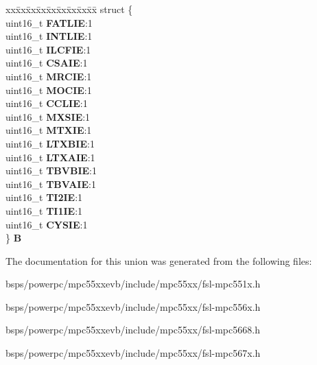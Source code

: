 \begin{DoxyCompactItemize}
\begin{tabbing}
\end{tabbing}\item 
\mbox{\label{unionuPIER0_aa1c26bbf66ee9ffb0bde25cbbf046ac5}} 
\begin{tabbing}
xx\=xx\=xx\=xx\=xx\=xx\=xx\=xx\=xx\=\kill
struct \{\\
\>uint16\_t {\bfseries FATLIE}:1\\
\>uint16\_t {\bfseries INTLIE}:1\\
\>uint16\_t {\bfseries ILCFIE}:1\\
\>uint16\_t {\bfseries CSAIE}:1\\
\>uint16\_t {\bfseries MRCIE}:1\\
\>uint16\_t {\bfseries MOCIE}:1\\
\>uint16\_t {\bfseries CCLIE}:1\\
\>uint16\_t {\bfseries MXSIE}:1\\
\>uint16\_t {\bfseries MTXIE}:1\\
\>uint16\_t {\bfseries LTXBIE}:1\\
\>uint16\_t {\bfseries LTXAIE}:1\\
\>uint16\_t {\bfseries TBVBIE}:1\\
\>uint16\_t {\bfseries TBVAIE}:1\\
\>uint16\_t {\bfseries TI2IE}:1\\
\>uint16\_t {\bfseries TI1IE}:1\\
\>uint16\_t {\bfseries CYSIE}:1\\
\} {\bfseries B}\\

\end{tabbing}\end{DoxyCompactItemize}


The documentation for this union was generated from the following files\+:\begin{DoxyCompactItemize}
\item 
bsps/powerpc/mpc55xxevb/include/mpc55xx/fsl-\/mpc551x.\+h\item 
bsps/powerpc/mpc55xxevb/include/mpc55xx/fsl-\/mpc556x.\+h\item 
bsps/powerpc/mpc55xxevb/include/mpc55xx/fsl-\/mpc5668.\+h\item 
bsps/powerpc/mpc55xxevb/include/mpc55xx/fsl-\/mpc567x.\+h\end{DoxyCompactItemize}
